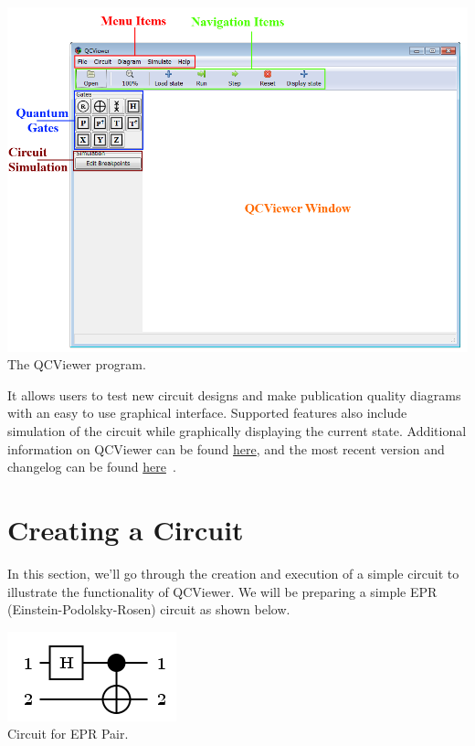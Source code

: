 \documentclass[10pt]{article}
\theoremstyle{definition}
\begin{document}
\begin{center}
\includegraphics[scale=0.50]{Figures/QCViewerGUI.png} \\
The QCViewer program.
\end{center}

It allows users to test new circuit designs and make publication quality diagrams with an easy to use graphical interface. Supported features also include simulation of the circuit while graphically displaying the current state. Additional information on QCViewer can be found \href{http://qcirc.iqc.uwaterloo.ca/QCViewer/QCViewer.pdf}{here}, and the most recent version and changelog can be found \href{http://qcirc.iqc.uwaterloo.ca/index.php?n=Projects.QCViewer}{here}~\cite{Parent2011Quantum}. 

\section{Creating a Circuit} \label{sec:CreatingaCircuit}
In this section, we'll go through the creation and execution of a simple circuit to illustrate the functionality of QCViewer. We will be preparing a simple EPR (Einstein-Podolsky-Rosen) circuit as shown below.
\begin{center}
\includegraphics[scale=.7]{Figures/CreateCircuit/EPRCircuit}\\
Circuit for EPR Pair.
\end{center}
\end{document}
